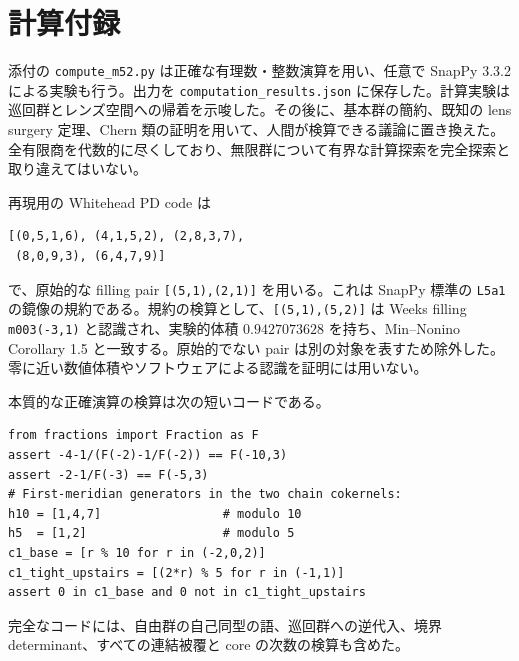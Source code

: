 \documentclass[12pt]{amsart}
\theoremstyle{definition}
\theoremstyle{remark}
\numberwithin{equation}{section}
\theoremstyle{definition}
\begin{document}
\section*{計算付録}
添付の \texttt{compute\_m52.py} は正確な有理数・整数演算を用い、任意で SnapPy 3.3.2 による実験も行う。出力を \texttt{computation\_results.json} に保存した。計算実験は巡回群とレンズ空間への帰着を示唆した。その後に、基本群の簡約、既知の lens surgery 定理、Chern 類の証明を用いて、人間が検算できる議論に置き換えた。全有限商を代数的に尽くしており、無限群について有界な計算探索を完全探索と取り違えてはいない。

再現用の Whitehead PD code は
\begin{verbatim}
[(0,5,1,6), (4,1,5,2), (2,8,3,7),
 (8,0,9,3), (6,4,7,9)]
\end{verbatim}
で、原始的な filling pair \texttt{[(5,1),(2,1)]} を用いる。これは SnapPy 標準の \texttt{L5a1} の鏡像の規約である。規約の検算として、\texttt{[(5,1),(5,2)]} は Weeks filling \texttt{m003(-3,1)} と認識され、実験的体積 $0.9427073628$ を持ち、Min--Nonino Corollary 1.5 と一致する。原始的でない pair は別の対象を表すため除外した。零に近い数値体積やソフトウェアによる認識を証明には用いない。

本質的な正確演算の検算は次の短いコードである。
\begin{verbatim}
from fractions import Fraction as F
assert -4-1/(F(-2)-1/F(-2)) == F(-10,3)
assert -2-1/F(-3) == F(-5,3)
# First-meridian generators in the two chain cokernels:
h10 = [1,4,7]                 # modulo 10
h5  = [1,2]                   # modulo 5
c1_base = [r % 10 for r in (-2,0,2)]
c1_tight_upstairs = [(2*r) % 5 for r in (-1,1)]
assert 0 in c1_base and 0 not in c1_tight_upstairs
\end{verbatim}
完全なコードには、自由群の自己同型の語、巡回群への逆代入、境界 determinant、すべての連結被覆と core の次数の検算も含めた。
\end{document}
